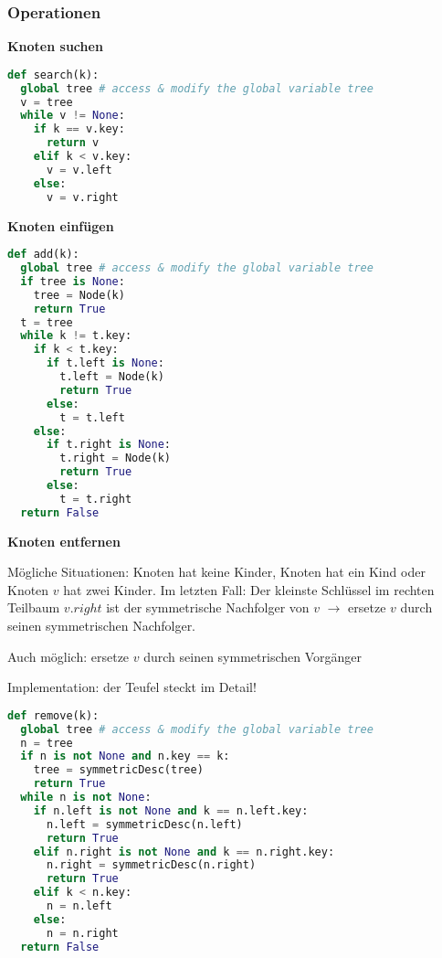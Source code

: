 \documentclass[german]{latex4ei/latex4ei_sheet}
\begin{document}
\begin{sectionbox}
\subsubsection{Operationen}\smallskip
\textbf{Knoten suchen}\par\vspace{-4px}
\begin{lstlisting}[language=Python]
def search(k):
  global tree # access & modify the global variable tree
  v = tree
  while v != None:
    if k == v.key:
      return v
    elif k < v.key:
      v = v.left
    else:
      v = v.right
\end{lstlisting}

\textbf{Knoten einfügen}\par\vspace{-4px}
\begin{lstlisting}[language=Python]
def add(k):
  global tree # access & modify the global variable tree
  if tree is None:
    tree = Node(k)
    return True
  t = tree
  while k != t.key:
    if k < t.key:
      if t.left is None:
        t.left = Node(k)
        return True
      else:
        t = t.left
    else:
      if t.right is None:
        t.right = Node(k)
        return True
      else:
        t = t.right
  return False
\end{lstlisting}

\textbf{Knoten entfernen}\par
Mögliche Situationen: Knoten hat keine Kinder, Knoten hat ein Kind oder Knoten $v$ hat zwei Kinder.
Im letzten Fall: Der kleinste Schlüssel im rechten Teilbaum $v.right$ ist der symmetrische Nachfolger von $v$ $\rightarrow$ ersetze $v$ durch seinen symmetrischen Nachfolger.
\par Auch möglich: ersetze $v$ durch seinen symmetrischen Vorgänger
\par Implementation: der Teufel steckt im Detail!
\vspace{-4px}

\begin{lstlisting}[language=Python]
def remove(k):
  global tree # access & modify the global variable tree
  n = tree
  if n is not None and n.key == k:
    tree = symmetricDesc(tree)
    return True
  while n is not None:
    if n.left is not None and k == n.left.key:
      n.left = symmetricDesc(n.left)
      return True
    elif n.right is not None and k == n.right.key:
      n.right = symmetricDesc(n.right)
      return True
    elif k < n.key:
      n = n.left
    else:
      n = n.right
  return False
\end{lstlisting}


\end{sectionbox}
\end{document}
